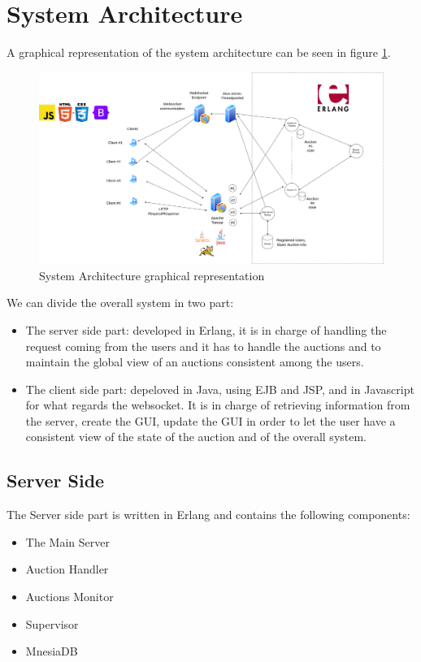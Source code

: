 \section{System Architecture}
\noindent A graphical representation of the system architecture can be seen in figure \ref{fig:architecture}.

\begin{figure}[H]
	\centering
	\includegraphics[width=1\linewidth]{img/systemStructure.png}
	\caption{System Architecture graphical representation}
	\label{fig:architecture}
\end{figure}

\noindent We can divide the overall system in two part:
\begin{itemize}
	\item The server side part: developed in Erlang, it is in charge of handling the request coming from the users and it has to handle the auctions and to maintain the global view of an auctions consistent among the users.
	
	\item The client side part: depeloved in Java, using EJB and JSP, and in Javascript for what regards the websocket. It is in charge of retrieving information from the server, create the GUI, update the GUI in order to let the user have a consistent view of the state of the auction and of the overall system.
\end{itemize}

\subsection{Server Side}
\noindent The Server side part is written in Erlang and contains the following components:

\begin{itemize}
	\item The Main Server
	\item Auction Handler
	\item Auctions Monitor
	\item Supervisor
	\item MnesiaDB
\end{itemize}

